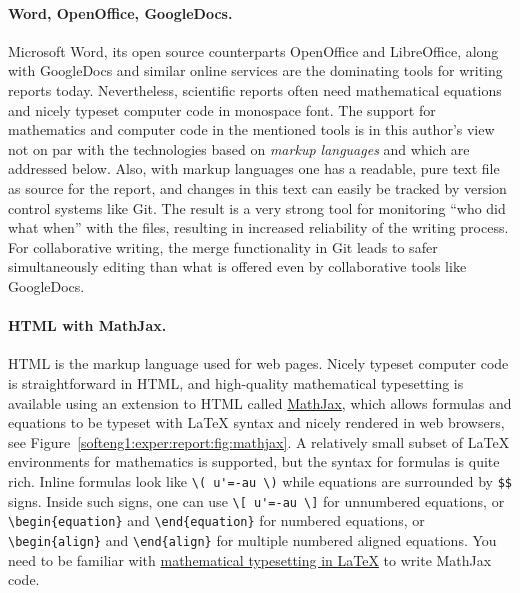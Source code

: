 \documentclass[%
oneside,                 %
final,                   %
10pt]{article}
\begin{document}
\paragraph{Word, OpenOffice, GoogleDocs.}
Microsoft Word, its open source counterparts OpenOffice and
LibreOffice, along with GoogleDocs and similar online services are the
dominating tools for writing reports today. Nevertheless, scientific
reports often need mathematical equations and nicely typeset computer
code in monospace font. The support for mathematics and computer code
in the mentioned tools is in this author's view not on par with the
technologies based on \emph{markup languages} and which are addressed
below. Also, with markup languages one has a readable, pure text file
as source for the report, and changes in this text can easily be
tracked by version control systems like Git. The result is a very
strong tool for monitoring ``who did what when'' with the files,
resulting in increased reliability of the writing process. For
collaborative writing, the merge functionality in Git leads to safer
simultaneously editing than what is offered even by collaborative
tools like GoogleDocs.




\paragraph{HTML with MathJax.}
HTML is the markup language used for web pages.  Nicely typeset computer
code is straightforward in HTML, and high-quality mathematical
typesetting is available using an extension to HTML called \href{{http://www.mathjax.org/}}{MathJax}, which allows formulas and equations to be
typeset with {\LaTeX} syntax and nicely rendered in web browsers, see
Figure~\ref{softeng1:exper:report:fig:mathjax}.  A relatively small
subset of {\LaTeX} environments for mathematics is supported, but the
syntax for formulas is quite rich. Inline formulas look like \Verb!\( u'=-au \)! while equations are surrounded by \Verb!$$! signs.  Inside such
signs, one can use \Verb!\[ u'=-au \]! for unnumbered equations, or
\Verb!\begin{equation}! and \Verb!\end{equation}! for
numbered equations, or \Verb!\begin{align}! and \Verb!\end{align}! for multiple
numbered aligned equations.  You need to be familiar with \href{{http://en.wikibooks.org/wiki/LaTeX/Mathematics}}{mathematical
typesetting in LaTeX} to write MathJax
code.
\end{document}

